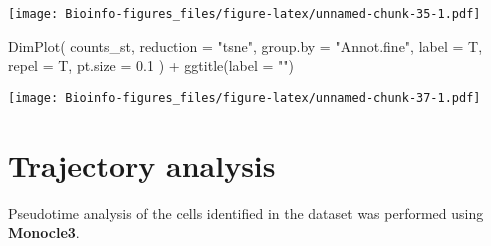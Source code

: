 \documentclass[
  openany]{book}
\newenvironment{Shaded}{\begin{snugshade}}{\end{snugshade}}
\newcommand{\AttributeTok}[1]{\textcolor[rgb]{0.77,0.63,0.00}{#1}}
\newcommand{\FloatTok}[1]{\textcolor[rgb]{0.00,0.00,0.81}{#1}}
\newcommand{\FunctionTok}[1]{\textcolor[rgb]{0.00,0.00,0.00}{#1}}
\newcommand{\NormalTok}[1]{#1}
\newcommand{\OtherTok}[1]{\textcolor[rgb]{0.56,0.35,0.01}{#1}}
\newcommand{\SpecialCharTok}[1]{\textcolor[rgb]{0.00,0.00,0.00}{#1}}
\newcommand{\StringTok}[1]{\textcolor[rgb]{0.31,0.60,0.02}{#1}}
\begin{document}
\texttt{[image: Bioinfo-figures\_files/figure-latex/unnamed-chunk-35-1.pdf]}

\begin{Shaded}
\end{Shaded}

\begin{Shaded}
\begin{Highlighting}[]
\FunctionTok{DimPlot}\NormalTok{(}
\NormalTok{  counts\_st,}
  \AttributeTok{reduction =} \StringTok{"tsne"}\NormalTok{,}
  \AttributeTok{group.by =} \StringTok{"Annot.fine"}\NormalTok{,}
  \AttributeTok{label =}\NormalTok{ T,}
  \AttributeTok{repel =}\NormalTok{ T,}
  \AttributeTok{pt.size =} \FloatTok{0.1}
\NormalTok{) }\SpecialCharTok{+} \FunctionTok{ggtitle}\NormalTok{(}\AttributeTok{label =} \StringTok{""}\NormalTok{)}
\end{Highlighting}
\end{Shaded}

\texttt{[image: Bioinfo-figures\_files/figure-latex/unnamed-chunk-37-1.pdf]}

\clearpage

\hypertarget{trajectory-analysis}{%
\section{Trajectory analysis}\label{trajectory-analysis}}

Pseudotime analysis of the cells identified in the dataset was performed using \textbf{Monocle3}.
\end{document}
